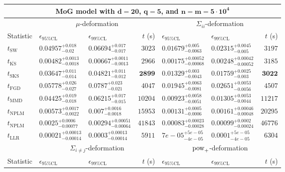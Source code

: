 \begin{tabular}{l|llr|llr}
	\toprule
	\multicolumn{7}{c}{{\bf MoG model with $\mathbf{d=20}$, $\mathbf{q=5}$, and $\mathbf{n=m=5\cdot 10^{4}}$}} \\
	\toprule
	\multicolumn{1}{c}{} & \multicolumn{3}{c}{$\mu$-deformation} & \multicolumn{3}{c}{$\Sigma_{ii}$-deformation} \\
	Statistic & $\epsilon_{95\%\mathrm{CL}}$ & $\epsilon_{99\%\mathrm{CL}}$ & $t$ (s) & $\epsilon_{95\%\mathrm{CL}}$ & $\epsilon_{99\%\mathrm{CL}}$ & $t$ (s) \\
	\midrule
	$t_{\mathrm{SW}}$ & $0.04957_{-0.02}^{+0.018}$ & $0.06694_{-0.017}^{+0.017}$ & $3023$ & $0.01679_{-0.0063}^{+0.005}$ & $0.02315_{-0.005}^{+0.0045}$ & $3197$ \\
	$t_{\overline{\mathrm{KS}}}$ & ${\mathbf{0.00482_{-0.0018}^{+0.0013}}}$ & ${\mathbf{0.00667_{-0.0013}^{+0.0011}}}$ & $2966$ & ${\mathbf{0.00175_{-0.00068}^{+0.00052}}}$ & ${\mathbf{0.00248_{-0.00052}^{+0.00042}}}$ & $3185$ \\
	$t_{\mathrm{SKS}}$ & $0.03647_{-0.014}^{+0.011}$ & $0.04821_{-0.012}^{+0.011}$ & ${\mathbf{2899}}$ & $0.01329_{-0.0043}^{+0.003}$ & $0.01759_{-0.003}^{+0.0025}$ & ${\mathbf{3022}}$ \\
	$t_{\mathrm{FGD}}$ & $0.05778_{-0.027}^{+0.026}$ & $0.0787_{-0.021}^{+0.023}$ & $4047$ & $0.01945_{-0.0081}^{+0.0063}$ & $0.02651_{-0.0056}^{+0.0053}$ & $4507$ \\
	$t_{\mathrm{MMD}}$ & $0.04425_{-0.018}^{+0.019}$ & $0.06215_{-0.015}^{+0.017}$ & $10204$ & $0.00923_{-0.0051}^{+0.0058}$ & $0.01305_{-0.0044}^{+0.0053}$ & $11217$ \\
\rowcolor{red!35}	$t_{\mathrm{NPLM}}$ & $0.00573_{-0.0022}^{+0.0017}$ & $0.007_{-0.0018}^{+0.0016}$ & $15953$ & $0.00131_{-0.0006}^{+0.0005}$ & $0.00161_{-0.00048}^{+0.00046}$ & $20295$ \\
\rowcolor{blue!35}	$t_{\mathrm{NPLM}}$ & $0.0025_{-0.00077}^{+0.0006}$ & $0.00294_{-0.00064}^{+0.00051}$ & $41843$ & $0.00083_{-0.00028}^{+0.00023}$ & $0.00099_{-0.00024}^{+0.0002}$ & $46776$ \\
	$t_{\mathrm{LLR}}$ & $0.00021_{-0.00014}^{+0.00013}$ & $0.0003_{-0.00014}^{+0.00013}$ & $5911$ & $7e-05_{-4e-05}^{+5e-05}$ & $0.0001_{-4e-05}^{+5e-05}$ & $6304$ \\
	\toprule
	\multicolumn{1}{c}{} & \multicolumn{3}{c}{$\Sigma_{i\neq j}$-deformation} & \multicolumn{3}{c}{$\rm{pow}_{+}$-deformation} \\
	Statistic & $\epsilon_{95\%\mathrm{CL}}$ & $\epsilon_{99\%\mathrm{CL}}$ & $t$ (s) & $\epsilon_{95\%\mathrm{CL}}$ & $\epsilon_{99\%\mathrm{CL}}$ & $t$ (s) \\

\end{tabular}
